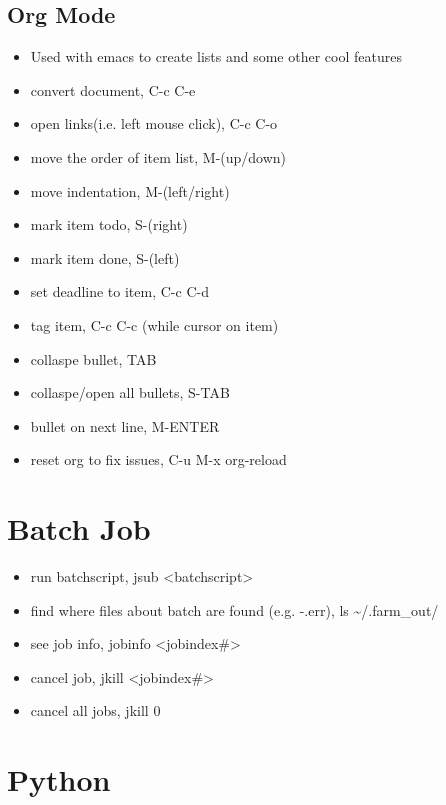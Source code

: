 \documentclass[11pt]{article}
\begin{document}
\subsection{Org Mode}
\label{sec:orgafcc718}
\begin{itemize}
\item Used with emacs to create lists and some other cool features
\item convert document, C-c C-e
\item open links(i.e. left mouse click), C-c C-o
\item move the order of item list, M-(up/down)
\item move indentation, M-(left/right)
\item mark item todo, S-(right)
\item mark item done, S-(left)
\item set deadline to item, C-c C-d
\item tag item, C-c C-c (while cursor on item)
\item collaspe bullet, TAB
\item collaspe/open all bullets, S-TAB
\item bullet on next line, M-ENTER
\item reset org to fix issues, C-u M-x org-reload
\end{itemize}
\section{Batch Job}
\label{sec:org84e31b3}
\begin{itemize}
\item run batchscript, jsub <batchscript>
\item find where files about batch are found (e.g. -.err), ls \textasciitilde{}/.farm\_out/
\item see job info, jobinfo <jobindex\#>
\item cancel job, jkill <jobindex\#>
\item cancel all jobs, jkill 0
\end{itemize}
\section{Python}
\label{sec:orgf55fe75}
\end{document}
